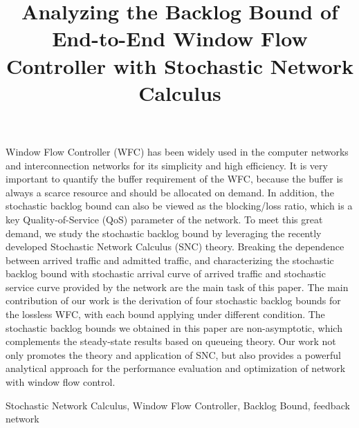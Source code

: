 \documentclass[paper]{ieice}
\title{Analyzing the Backlog Bound of End-to-End Window Flow Controller with Stochastic Network Calculus}
\begin{document}
\maketitle
\begin{summary}
Window Flow Controller (WFC) has been widely used in the computer networks and interconnection networks for its simplicity and high efficiency. It is very important to quantify the buffer requirement of the WFC, because the buffer is always a scarce resource and should be allocated on demand. In addition, the stochastic backlog bound can also be viewed as the blocking/loss ratio, which is a key Quality-of-Service (QoS) parameter of the network. To meet this great demand, we study the stochastic backlog bound by leveraging the recently developed Stochastic Network Calculus (SNC) theory. Breaking the dependence between arrived traffic and admitted traffic, and characterizing the stochastic backlog bound with stochastic arrival curve of arrived traffic and stochastic service curve provided by the network are the main task of this paper. The main contribution of our work is the derivation of four stochastic backlog bounds for the lossless WFC, with each bound applying under different condition. The stochastic backlog bounds we obtained in this paper are non-asymptotic, which complements the steady-state results based on queueing theory. Our work not only promotes the theory and application of SNC, but also provides a powerful analytical approach for the performance evaluation and optimization of network with window flow control.
\end{summary}
\begin{keywords}
Stochastic Network Calculus, Window Flow Controller, Backlog Bound, feedback network
\end{keywords}
\end{document}
